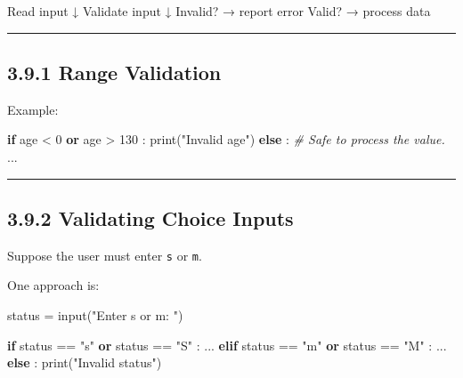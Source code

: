 \documentclass[
  11pt,
  a4paper,
]{article}
\newenvironment{Shaded}{}{}
\newcommand{\BuiltInTok}[1]{\textcolor[rgb]{0.00,0.50,0.00}{#1}}
\newcommand{\CommentTok}[1]{\textcolor[rgb]{0.38,0.63,0.69}{\textit{#1}}}
\newcommand{\ControlFlowTok}[1]{\textcolor[rgb]{0.00,0.44,0.13}{\textbf{#1}}}
\newcommand{\DecValTok}[1]{\textcolor[rgb]{0.25,0.63,0.44}{#1}}
\newcommand{\KeywordTok}[1]{\textcolor[rgb]{0.00,0.44,0.13}{\textbf{#1}}}
\newcommand{\NormalTok}[1]{#1}
\newcommand{\OperatorTok}[1]{\textcolor[rgb]{0.40,0.40,0.40}{#1}}
\newcommand{\StringTok}[1]{\textcolor[rgb]{0.25,0.44,0.63}{#1}}
\begin{document}
\begin{Shaded}
\begin{Highlighting}[]
\NormalTok{Read input}
\NormalTok{   ↓}
\NormalTok{Validate input}
\NormalTok{   ↓}
\NormalTok{Invalid? → report error}
\NormalTok{Valid?   → process data}
\end{Highlighting}
\end{Shaded}

\begin{center}\rule{0.5\linewidth}{0.5pt}\end{center}

\subsection{3.9.1 Range Validation}\label{range-validation}

Example:

\begin{Shaded}
\begin{Highlighting}[]
\ControlFlowTok{if}\NormalTok{ age }\OperatorTok{\textless{}} \DecValTok{0} \KeywordTok{or}\NormalTok{ age }\OperatorTok{\textgreater{}} \DecValTok{130}\NormalTok{ :}
    \BuiltInTok{print}\NormalTok{(}\StringTok{"Invalid age"}\NormalTok{)}
\ControlFlowTok{else}\NormalTok{ :}
    \CommentTok{\# Safe to process the value.}
\NormalTok{    ...}
\end{Highlighting}
\end{Shaded}

\begin{center}\rule{0.5\linewidth}{0.5pt}\end{center}

\subsection{3.9.2 Validating Choice
Inputs}\label{validating-choice-inputs}

Suppose the user must enter \texttt{s} or \texttt{m}.

One approach is:

\begin{Shaded}
\begin{Highlighting}[]
\NormalTok{status }\OperatorTok{=} \BuiltInTok{input}\NormalTok{(}\StringTok{"Enter s or m: "}\NormalTok{)}

\ControlFlowTok{if}\NormalTok{ status }\OperatorTok{==} \StringTok{"s"} \KeywordTok{or}\NormalTok{ status }\OperatorTok{==} \StringTok{"S"}\NormalTok{ :}
\NormalTok{    ...}
\ControlFlowTok{elif}\NormalTok{ status }\OperatorTok{==} \StringTok{"m"} \KeywordTok{or}\NormalTok{ status }\OperatorTok{==} \StringTok{"M"}\NormalTok{ :}
\NormalTok{    ...}
\ControlFlowTok{else}\NormalTok{ :}
    \BuiltInTok{print}\NormalTok{(}\StringTok{"Invalid status"}\NormalTok{)}
\end{Highlighting}
\end{Shaded}
\end{document}

